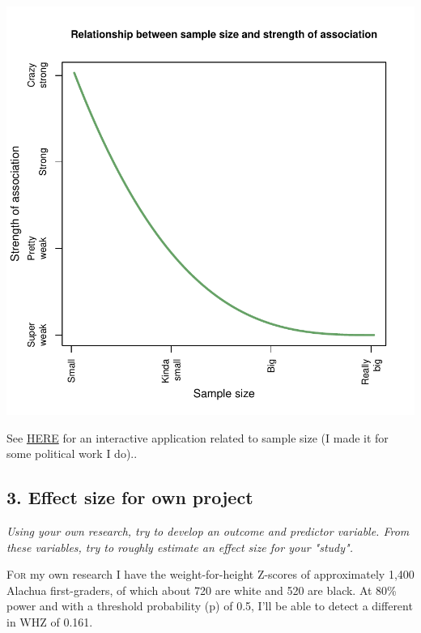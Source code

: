 \documentclass[11pt]{article}
\begin{document}
\begin{multicols}{2}
\begin{center}
\includegraphics{hw4_brew-001}
\end{center}

See \href{https://analystinstitute.org/power-calculator/}{HERE} for an interactive application related to sample size (I made it for some political work I do)..


\subsection*{3. Effect size for own project}

\emph{Using your own research, try to develop an outcome and predictor variable. From these variables, try to roughly estimate an effect size for your "study".}

\lettrine[nindent=0em,lines=3]{F}{or} my own research I have the weight-for-height Z-scores of approximately 1,400 Alachua first-graders, of which about 720 are white and 520 are black.  At 80\% power and with a threshold probability (p) of 0.5, I'll be able to detect a different in WHZ of 0.161.\cite{dcr}



\end{multicols}
\newpage


\end{document}

